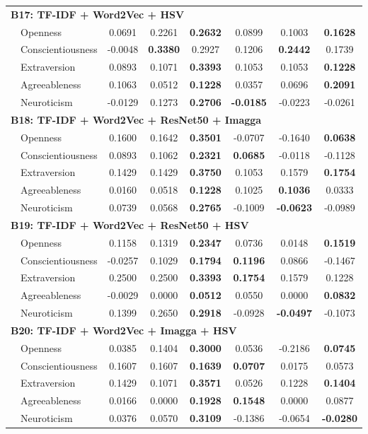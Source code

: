 \begin{longtable}{llcccccc}
\hline
\multicolumn{8}{l}{\textbf{B17: TF-IDF + Word2Vec + HSV}} \\
& Openness & 0.0691 & 0.2261 & \textbf{0.2632} & 0.0899 & 0.1003 & \textbf{0.1628} \\
& Conscientiousness & -0.0048 & \textbf{0.3380} & 0.2927 & 0.1206 & \textbf{0.2442} & 0.1739 \\
& Extraversion & 0.0893 & 0.1071 & \textbf{0.3393} & 0.1053 & 0.1053 & \textbf{0.1228} \\
& Agreeableness & 0.1063 & 0.0512 & \textbf{0.1228} & 0.0357 & 0.0696 & \textbf{0.2091} \\
& Neuroticism & -0.0129 & 0.1273 & \textbf{0.2706} & \textbf{-0.0185} & -0.0223 & -0.0261 \\

\hline
\multicolumn{8}{l}{\textbf{B18: TF-IDF + Word2Vec + ResNet50 + Imagga}} \\
& Openness & 0.1600 & 0.1642 & \textbf{0.3501} & -0.0707 & -0.1640 & \textbf{0.0638} \\
& Conscientiousness & 0.0893 & 0.1062 & \textbf{0.2321} & \textbf{0.0685} & -0.0118 & -0.1128 \\
& Extraversion & 0.1429 & 0.1429 & \textbf{0.3750} & 0.1053 & 0.1579 & \textbf{0.1754} \\
& Agreeableness & 0.0160 & 0.0518 & \textbf{0.1228} & 0.1025 & \textbf{0.1036} & 0.0333 \\
& Neuroticism & 0.0739 & 0.0568 & \textbf{0.2765} & -0.1009 & \textbf{-0.0623} & -0.0989 \\

\hline
\multicolumn{8}{l}{\textbf{B19: TF-IDF + Word2Vec + ResNet50 + HSV}} \\
& Openness & 0.1158 & 0.1319 & \textbf{0.2347} & 0.0736 & 0.0148 & \textbf{0.1519} \\
& Conscientiousness & -0.0257 & 0.1029 & \textbf{0.1794} & \textbf{0.1196} & 0.0866 & -0.1467 \\
& Extraversion & 0.2500 & 0.2500 & \textbf{0.3393} & \textbf{0.1754} & 0.1579 & 0.1228 \\
& Agreeableness & -0.0029 & 0.0000 & \textbf{0.0512} & 0.0550 & 0.0000 & \textbf{0.0832} \\
& Neuroticism & 0.1399 & 0.2650 & \textbf{0.2918} & -0.0928 & \textbf{-0.0497} & -0.1073 \\

\hline
\multicolumn{8}{l}{\textbf{B20: TF-IDF + Word2Vec + Imagga + HSV}} \\
& Openness & 0.0385 & 0.1404 & \textbf{0.3000} & 0.0536 & -0.2186 & \textbf{0.0745} \\
& Conscientiousness & 0.1607 & 0.1607 & \textbf{0.1639} & \textbf{0.0707} & 0.0175 & 0.0573 \\
& Extraversion & 0.1429 & 0.1071 & \textbf{0.3571} & 0.0526 & 0.1228 & \textbf{0.1404} \\
& Agreeableness & 0.0166 & 0.0000 & \textbf{0.1928} & \textbf{0.1548} & 0.0000 & 0.0877 \\
& Neuroticism & 0.0376 & 0.0570 & \textbf{0.3109} & -0.1386 & -0.0654 & \textbf{-0.0280} \\


\end{longtable}
